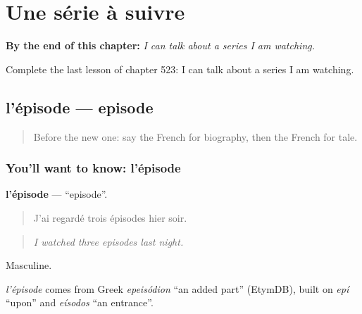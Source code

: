 
\chapter{Une série à suivre}
\label{ch:fr-une-serie-a-suivre}

\begin{chapteropening}
\textbf{By the end of this chapter:} \emph{I can talk about a series I am watching.}

Complete the last lesson of chapter 523: I can talk about a series I am watching.
\end{chapteropening}

\section[l'épisode]{l'épisode — episode}

\label{lesson:FR-C523-episode}



\begin{quote}
Before the new one: say the French for biography, then the French for tale.
\end{quote}

\subsection*{You'll want to know: l'épisode}
\textbf{l'épisode} — \textquotedblleft{}episode\textquotedblright{}.

\begin{quote}
J'ai regardé trois épisodes hier soir.
\end{quote}

\begin{quote}
\emph{I watched three episodes last night.}
\end{quote}

Masculine.

\begin{cousinweb}
\emph{l'épisode} comes from Greek \emph{epeisódion} \textquotedblleft{}an added part\textquotedblright{} (EtymDB), built on \emph{epí} \textquotedblleft{}upon\textquotedblright{} and \emph{eísodos} \textquotedblleft{}an entrance\textquotedblright{}.
\end{cousinweb}

